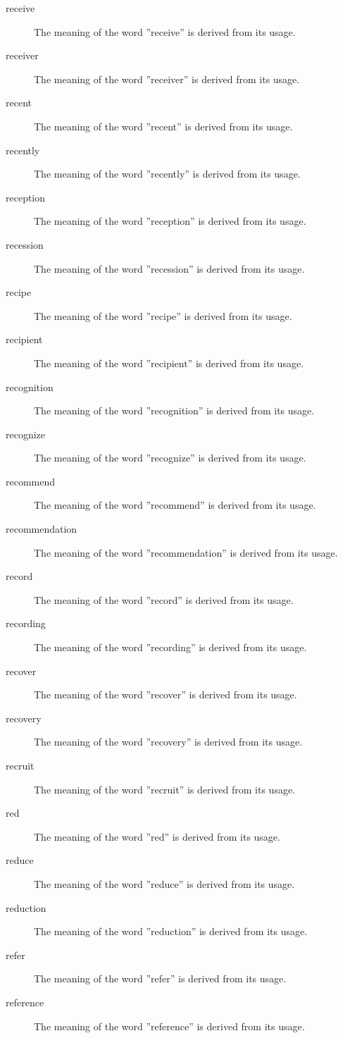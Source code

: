 \documentclass[12pt, letterpaper]{memoir}
\begin{document}
\begin{description}
\item[receive] The meaning of the word ''receive'' is derived from its usage.
\item[receiver] The meaning of the word ''receiver'' is derived from its usage.
\item[recent] The meaning of the word ''recent'' is derived from its usage.
\item[recently] The meaning of the word ''recently'' is derived from its usage.
\item[reception] The meaning of the word ''reception'' is derived from its usage.
\item[recession] The meaning of the word ''recession'' is derived from its usage.
\item[recipe] The meaning of the word ''recipe'' is derived from its usage.
\item[recipient] The meaning of the word ''recipient'' is derived from its usage.
\item[recognition] The meaning of the word ''recognition'' is derived from its usage.
\item[recognize] The meaning of the word ''recognize'' is derived from its usage.
\item[recommend] The meaning of the word ''recommend'' is derived from its usage.
\item[recommendation] The meaning of the word ''recommendation'' is derived from its usage.
\item[record] The meaning of the word ''record'' is derived from its usage.
\item[recording] The meaning of the word ''recording'' is derived from its usage.
\item[recover] The meaning of the word ''recover'' is derived from its usage.
\item[recovery] The meaning of the word ''recovery'' is derived from its usage.
\item[recruit] The meaning of the word ''recruit'' is derived from its usage.
\item[red] The meaning of the word ''red'' is derived from its usage.
\item[reduce] The meaning of the word ''reduce'' is derived from its usage.
\item[reduction] The meaning of the word ''reduction'' is derived from its usage.
\item[refer] The meaning of the word ''refer'' is derived from its usage.
\item[reference] The meaning of the word ''reference'' is derived from its usage.

\end{description}
\end{document}
